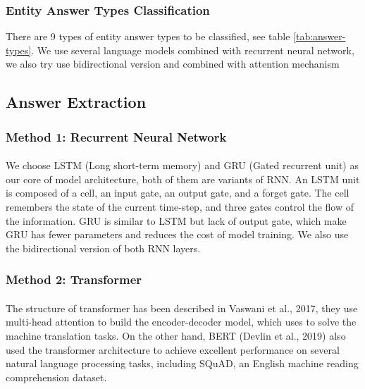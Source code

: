\documentclass{article}
\begin{document}
\subsubsection{Entity Answer Types Classification}
There are 9 types of entity answer types to be classified, see table \ref{tab:answer-types}. We use several language models combined with recurrent neural network, we also try use bidirectional version and combined with attention mechanism

\subsection{Answer Extraction}
\subsubsection{Method 1: Recurrent Neural Network}
\paragraph{}
We choose LSTM\cite{hochreiter1997lstm} (Long short-term memory) and GRU\cite{cho2014learning} (Gated recurrent unit) as our core of model architecture, both of them are variants of RNN. An LSTM unit is composed of a cell, an input gate, an output gate, and a forget gate. The cell remembers the state of the current time-step, and three gates control the flow of the information. GRU is similar to LSTM but lack of output gate, which make GRU has fewer parameters and reduces the cost of model training. We also use the bidirectional version of both RNN layers.

\subsubsection{Method 2: Transformer}
\paragraph{}
The structure of transformer\cite{vaswani2017attention} has been described in Vaswani et al., 2017, they use multi-head attention to build the encoder-decoder model, which uses to solve the machine translation tasks. On the other hand, BERT\cite{devlin2018bert} (Devlin et al., 2019) also used the transformer architecture to achieve excellent performance on several natural language processing tasks, including SQuAD, an English machine reading comprehension dataset.
\end{document}
